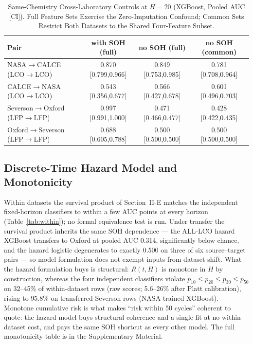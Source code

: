 \documentclass[11pt,a4paper]{article}
\begin{document}
\begin{table}[!t]
\caption{Same-Chemistry Cross-Laboratory Controls at $H{=}20$ (XGBoost, Pooled AUC [CI]). Full Feature Sets Exercise the Zero-Imputation Confound; Common Sets Restrict Both Datasets to the Shared Four-Feature Subset.}
\label{tab:samechem}
\centering
\footnotesize
\begin{tabular}{lccc}
\toprule
\textbf{Pair} & \textbf{with SOH (full)} & \textbf{no SOH (full)} & \textbf{no SOH (common)}\\
\midrule
NASA$\to$CALCE (LCO$\to$LCO) & 0.870 [0.799,0.966] & 0.849 [0.753,0.985] & 0.781 [0.708,0.964] \\
CALCE$\to$NASA (LCO$\to$LCO) & 0.543 [0.356,0.677] & 0.566 [0.427,0.678] & 0.601 [0.496,0.703] \\
Severson$\to$Oxford (LFP$\to$LFP) & 0.997 [0.991,1.000] & 0.471 [0.466,0.477] & 0.428 [0.422,0.435] \\
Oxford$\to$Severson (LFP$\to$LFP) & 0.688 [0.605,0.788] & 0.500 [0.500,0.500] & 0.500 [0.500,0.500] \\
\bottomrule
\end{tabular}
\end{table}

\subsection{Discrete-Time Hazard Model and Monotonicity}
Within datasets the survival product of Section~II-E matches the independent fixed-horizon classifiers to within a few AUC points at every horizon (Table~\ref{tab:within}); no formal equivalence test is run. Under transfer the survival product inherits the same SOH dependence --- the ALL-LCO hazard XGBoost transfers to Oxford at pooled AUC 0.314, significantly below chance, and the hazard logistic degenerates to exactly 0.500 on three of six source--target pairs --- so model formulation does not exempt inputs from dataset shift. What the hazard formulation buys is structural: $R(t,H)$ is monotone in $H$ by construction, whereas the four independent classifiers violate $p_{10}\le p_{20}\le p_{30}\le p_{50}$ on 32--45\% of within-dataset rows (raw scores; 5.6--26\% after Platt calibration), rising to 95.8\% on transferred Severson rows (NASA-trained XGBoost). Monotone cumulative risk is what makes ``risk within 50 cycles'' coherent to quote: the hazard model buys structural coherence and a single fit at no within-dataset cost, and pays the same SOH shortcut as every other model. The full monotonicity table is in the Supplementary Material.
\end{document}

